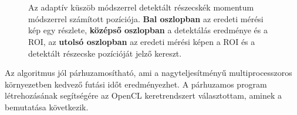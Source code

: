 	\begin{figure}[!ht]
		\centering
		\\
		\\
		\caption[Pozíciómérés momentum módszerrel]{Az adaptív küszöb módszerrel detektált részecskék
		momentum módszerrel számított pozíciója. \textbf{Bal oszlopban} az eredeti mérési kép egy részlete, \textbf{középső oszlopban} a
		detektálás eredménye és a ROI, az \textbf{utolsó oszlopban} az eredeti mérési képen a ROI és a detektált
		részecske pozícióját jelző kereszt.}
		\label{fig:roi}
	\end{figure}
	
	\noindent
	\begin{center}
	Az algoritmus jól párhuzamosítható, ami a nagyteljesítményű multiprocesszoros
	környezetben kedvező futási időt eredményezhet. A párhuzamos program létrehozásának segítségére az 
	OpenCL keretrendszert választottam, aminek a bemutatása következik.
	\end{center}





